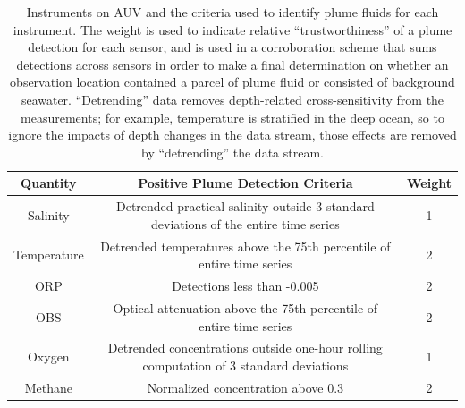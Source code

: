 \begin{table}[h!]
    \centering
    \begin{tabular}{c|c|c}
        Quantity & Positive Plume Detection Criteria & Weight  \\
        \hline
        Salinity & Detrended practical salinity outside 3 standard deviations of the entire time series & 1 \\
        Temperature & Detrended temperatures above the 75th percentile of entire time series & 2 \\
        ORP & Detections less than -0.005 & 2 \\
        OBS & Optical attenuation above the 75th percentile of entire time series & 2 \\
        Oxygen & Detrended concentrations outside one-hour rolling computation of 3 standard deviations & 1 \\
        Methane & Normalized concentration above 0.3 & 2
    \end{tabular}
    \caption{Instruments on AUV \Sentry and the criteria used to identify plume fluids for each instrument. The weight is used to indicate relative ``trustworthiness'' of a plume detection for each sensor, and is used in a corroboration scheme that sums detections across sensors in order to make a final determination on whether an observation location contained a parcel of plume fluid or consisted of background seawater. ``Detrending'' data removes depth-related cross-sensitivity from the measurements; for example, temperature is stratified in the deep ocean, so to ignore the impacts of depth changes in the data stream, those effects are removed by ``detrending'' the data stream.}
    \label{tab:sentry_instruments}
\end{table}

